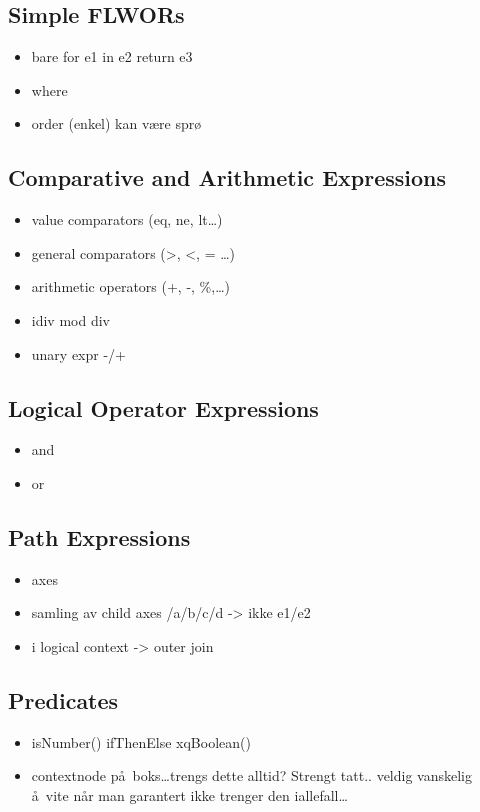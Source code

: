 \subsection{Simple FLWORs}
\label{sect:trans:TD:simpleFLWOR}
\begin{itemize}
  \item bare for e1 in e2 return e3
  \item where
  \item order (enkel) kan v\ae re spr\o
\end{itemize}

\subsection{Comparative and Arithmetic Expressions}
\label{sect:trans:TD:compArit}
\begin{itemize}
  \item value comparators (eq, ne, lt\ldots)
  \item general comparators (>, <, = \ldots)
  \item arithmetic operators (+, -, \%,\ldots)
  \item idiv mod div
  \item unary expr -/+
\end{itemize}

\subsection{Logical Operator Expressions}
\label{sect:trans:TD:logical}
\begin{itemize}
  \item and
  \item or
\end{itemize}

\subsection{Path Expressions}
\label{sect:trans:TD:pathExprs}
\begin{itemize}
  \item axes
  \item samling av child axes /a/b/c/d -> ikke e1/e2
  \item i logical context -> outer join
\end{itemize}

\subsection{Predicates}
\label{sect:trans:TD:predicates}
\begin{itemize}
  \item isNumber() ifThenElse xqBoolean()
  \item contextnode p\aa~boks\ldots trengs dette alltid? Strengt tatt.. veldig vanskelig \aa~vite n\aa r man
  garantert ikke trenger den iallefall\ldots
\end{itemize}

